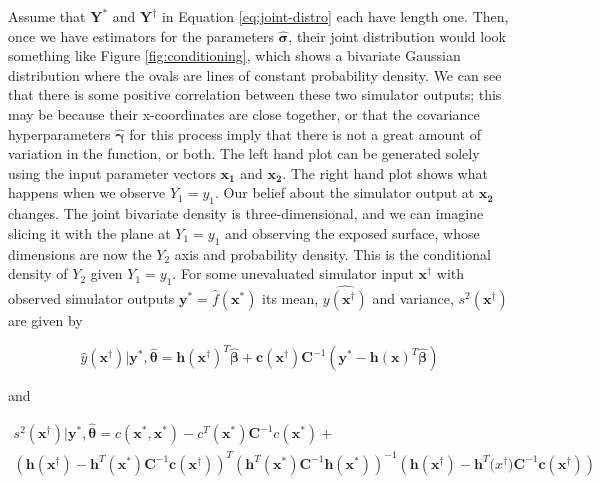 \documentclass[
  12pt,
  a4paper,
  twoside]{book}
\begin{document}
Assume that \(\mathbf{Y^*}\) and \(\mathbf{Y^\dagger}\) in Equation \eqref{eq:joint-distro} each have length one. Then, once we have estimators for the parameters \(\mathbf{\hat{\sigma}}\), their joint distribution would look something like Figure \ref{fig:conditioning}, which shows a bivariate Gaussian distribution where the ovals are lines of constant probability density. We can see that there is some positive correlation between these two simulator outputs; this may be because their x-coordinates are close together, or that the covariance hyperparameters \(\mathbf{\hat{\gamma}}\) for this process imply that there is not a great amount of variation in the function, or both. The left hand plot can be generated solely using the input parameter vectors \(\mathbf{x_1}\) and \(\mathbf{x_2}\). The right hand plot shows what happens when we observe \(Y_1 = y_1\). Our belief about the simulator output at \(\mathbf{x_2}\) changes. The joint bivariate density is three-dimensional, and we can imagine slicing it with the plane at \(Y_1=y_1\) and observing the exposed surface, whose dimensions are now the \(Y_2\) axis and probability density. This is the conditional density of \(Y_2\) given \(Y_1=y_1\). For some unevaluated simulator input \(\mathbf{x^\dagger}\) with observed simulator outputs \(\mathbf{y^*} = \hat{f}(\mathbf{x^*})\) its mean, \(\hat{y(\mathbf{x^\dagger})}\) and variance, \(s^2(\mathbf{x^\dagger})\) are given by

\begin{equation}
\label{eq:pred-mean}
\hat{y}(\mathbf{x^\dagger})| \mathbf{y^*}, \hat{\mathbf{\theta}} = \mathbf{h}(\mathbf{x^\dagger})^T \hat{\mathbf{\beta}} + \mathbf{c}(\mathbf{x}^\dagger) \mathbf{C}^{-1} \left( \mathbf{y^*} - \mathbf{h}(\mathbf{x})^T \hat{\mathbf{\beta}} \right)
\end{equation}

and

\begin{align}
\label{eq:pred-var}
s^2(\mathbf{x^\dagger})|\mathbf{y^*}, \hat{\mathbf{\theta}} = c(\mathbf{x^*}, \mathbf{x^*}) - c^T(\mathbf{x^*})\mathbf{C}^{-1} c(\mathbf{x^*}) +\\ \nonumber
\left( \mathbf{h}(\mathbf{x^\dagger}) - \mathbf{h}^T(\mathbf{x^*}) \mathbf{C}^{-1} \mathbf{c}(\mathbf{x^\dagger}) \right)^T \left( \mathbf{h}^T(\mathbf{\mathbf{x^*}}) \mathbf{C}^{-1} \mathbf{h}(\mathbf{x^*}) \right)^{-1} \left( \mathbf{h}(\mathbf{x^\dagger}) - \mathbf{h}^T \mathbf(x^\dagger) \mathbf{C}^{-1} \mathbf{c}(\mathbf{x^\dagger}) \right)
\end{align}
\end{document}
